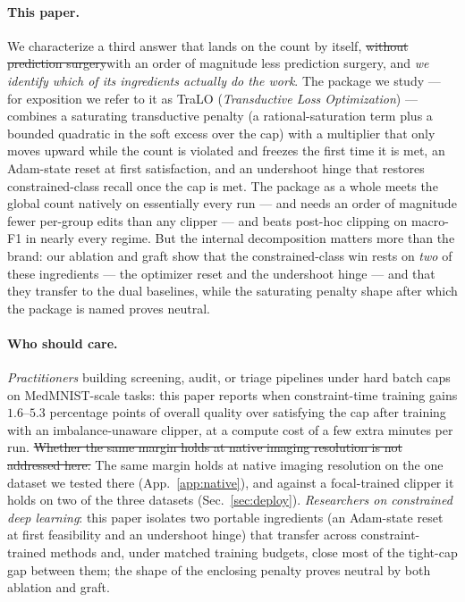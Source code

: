 \documentclass[10pt]{article}
\newcommand{\del}[1]{{\color{red}\sout{#1}}}
\begin{document}
\paragraph{This paper.} We characterize a third answer that lands on the count
by itself, \del{without prediction surgery}{\color{blue}with an order of
magnitude less prediction surgery}, and \emph{we identify which of its
ingredients actually do the work}. The package we study --- for exposition we
refer to it as TraLO (\emph{Transductive Loss Optimization}) --- combines a
saturating transductive penalty (a rational-saturation term plus a bounded
quadratic in the soft excess over the cap) with a multiplier that only moves
upward while the count is violated and freezes the first time it is met, an
Adam-state reset at first satisfaction, and an undershoot hinge that restores
constrained-class recall once the cap is met. The package as a whole meets the
{\color{blue}global} count natively on essentially every run
{\color{blue}--- and needs an order of magnitude fewer per-group edits than any
clipper ---} and beats post-hoc clipping on macro-F1
in nearly every regime. But the internal decomposition matters more than the
brand: our ablation and graft show that the constrained-class win rests on
\emph{two} of these ingredients --- the optimizer reset and the undershoot
hinge --- and that they transfer to the dual baselines, while the saturating
penalty shape after which the package is named proves neutral.

\paragraph{Who should care.}
\emph{Practitioners} building screening, audit, or triage pipelines under
hard batch caps on MedMNIST-scale tasks: this paper reports when
constraint-time training gains $1.6$--$5.3$ percentage points of overall
quality over satisfying the cap after training{\color{blue} with an
imbalance-unaware clipper}, at a compute cost of a few
extra minutes per run. \del{Whether the same margin holds at native imaging
resolution is not addressed here.}
{\color{blue}The same margin holds at native imaging resolution on the one
dataset we tested there (App.~\ref{app:native}), and against a focal-trained
clipper it holds on two of the three datasets (Sec.~\ref{sec:deploy}).}
\emph{Researchers on constrained deep learning}: this paper isolates two
portable ingredients (an Adam-state reset at first feasibility and an
undershoot hinge) that transfer across constraint-trained methods and,
under matched training budgets, close most of the tight-cap gap between
them; the shape of the enclosing penalty proves neutral by both ablation
and graft.
\end{document}
